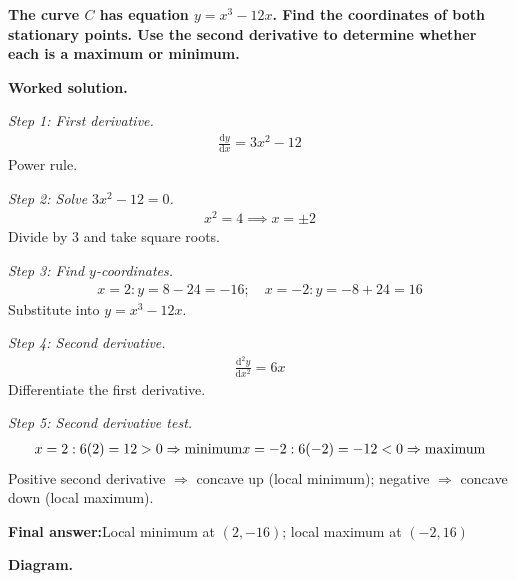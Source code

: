 \documentclass[11pt]{article}
\newcommand{\question}[1]{\par\medskip\noindent\textbf{#1}\par}
\begin{document}
\question{The curve \( C \) has equation \( y = x^3 - 12x \). Find the coordinates of both stationary points. Use the second derivative to determine whether each is a maximum or minimum.}

\textbf{Worked solution.}

\textit{Step 1: First derivative.}
\[\begin{gathered}
\frac{\mathrm{d}y}{\mathrm{d}x} = 3x^2 - 12
\end{gathered}\]
Power rule.

\textit{Step 2: Solve \( 3x^2 - 12 = 0 \).}
\[\begin{gathered}
x^2 = 4 \implies x = \pm 2
\end{gathered}\]
Divide by 3 and take square roots.

\textit{Step 3: Find \( y \)-coordinates.}
\[\begin{gathered}
x=2: y = 8 - 24 = -16; \quad x=-2: y = -8 + 24 = 16
\end{gathered}\]
Substitute into \( y = x^3 - 12x \).

\textit{Step 4: Second derivative.}
\[\begin{gathered}
\frac{\mathrm{d}^2y}{\mathrm{d}x^2} = 6x
\end{gathered}\]
Differentiate the first derivative.

\textit{Step 5: Second derivative test.}
\[\begin{gathered}
x=2: 6(2) = 12 > 0 \Rightarrow \text{minimum} \newline x=-2: 6(-2) = -12 < 0 \Rightarrow \text{maximum}
\end{gathered}\]
Positive second derivative \(\Rightarrow\) concave up (local minimum); negative \(\Rightarrow\) concave down (local maximum).

\begin{answerbox}
\textbf{Final answer:}\quad Local minimum at \(\displaystyle  (2, -16) \); local maximum at \(\displaystyle  (-2, 16) \)
\end{answerbox}
\textbf{Diagram.}
\end{document}
